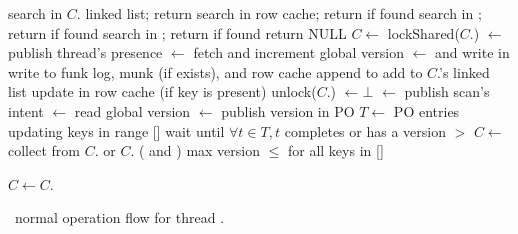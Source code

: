 \begin{algorithm}[tb]
\begin{algorithmic}[1]{}
			\State search  in $C$. linked list;  return 
		\EndIf
		\State search  in row cache; return  if found
			\State	search  in ; return  if found
		\EndIf
		\State	search  in ; return  if found
		\State return NULL	
\EndProcedure
\Statex
{}	
		\State $C \leftarrow$ 
		\State lockShared($C$.)
		\State  {}  $\leftarrow$ 
			 \Comment publish  thread's presence 
		\State {} $\leftarrow$    \Comment fetch and increment global version
		\State  {}  $\leftarrow$ 
			\Comment and write in 
		\Statex \Comment write  to funk log, munk (if exists), and row cache  
		\State append  to 
			\State add   to $C$.'s linked list
		\Else
		\State update  in row cache (if key is present)
		\EndIf
		\State unlock($C$.)
		\State {}  $\leftarrow \bot$ 
\EndProcedure
\Statex
{}
		\State  {}  $\leftarrow$  \Comment publish scan's intent 
		\State {} $\leftarrow$    \Comment read global version
		\State  {}  $\leftarrow$ 
		\Comment publish version in PO
		\State  $T \leftarrow $  PO entries updating keys in range [] 
		\State wait until $\forall t \in T, t$  completes or has a version $>$   
		\State $C \leftarrow$ 
		\Repeat
				\State collect from $C$. or $C$. ( and )
				\Statex \hspace{1cm} max version $\le$ for all keys in [] 

			\State $C \leftarrow C$. 
\EndProcedure	
\end{algorithmic}
\caption{\sys\ normal operation flow for thread .}
\label{alg:ops}
\end{algorithm}


